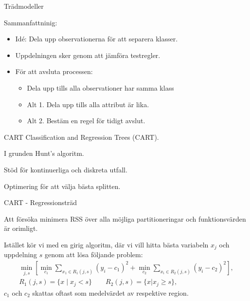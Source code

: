 \documentclass[10pt,english]{beamer}
\begin{document}
\begin{frame}{Trädmodeller}
    
    Sammanfattninig:
    \begin{itemize}
        \item Idé: Dela upp observationerna för att separera klasser.
        \item Uppdelningen sker genom att jämföra testregler.
        \item För att avsluta processen:
        \begin{itemize}
            \item Dela upp tills alla observationer har samma klass
            \item Alt 1. Dela upp tills alla attribut är lika.
            \item Alt 2. Bestäm en regel för tidigt avslut.
        \end{itemize}
    \end{itemize}

\end{frame}

\begin{frame}{CART}
    Classification and Regression Trees (CART).

    I grunden Hunt's algoritm.

    Stöd för kontinuerliga och diskreta utfall.

    Optimering för att välja bästa splitten.
\end{frame}

\begin{frame}{CART - Regressionsträd}
    
    Att försöka minimera RSS över alla möjliga partitioneringar och funktionsvärden är orimligt.

    Istället kör vi med en girig algoritm, där vi vill hitta bästa variabeln $x_j$ och uppdelning $s$ genom att lösa följande problem:
    \begin{align*}
        \min_{j,s} \left[ \min_{c_1} \sum_{x_1 \in R_1(j,s)} (y_i - c_1)^2 + \min_{c_2} \sum_{x_i \in R_2(j,s)} (y_i - c_2)^2 \right], \\
        R_1(j,s) = \{x \mid x_j < s\} \qquad R_2(j,s) = \{x | x_j \geq s\},
    \end{align*}
    $c_1$ och $c_2$ skattas oftast som medelvärdet av respektive region.
\end{frame}
\end{document}
